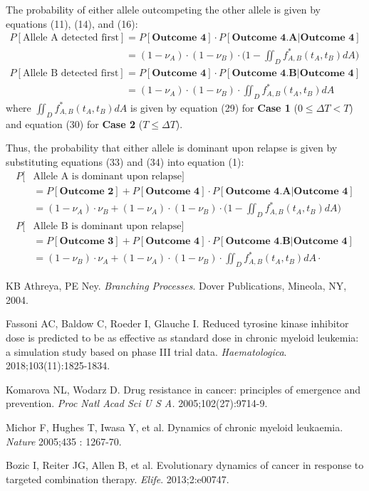 \documentclass{article}
\begin{document}
The probability of either allele outcompeting the other allele is given by equations (11), (14), and (16):
\begin{equation}
\begin{split}
P[\text{Allele A detected first}] &= P[\textbf{Outcome 4}] \cdot P[\textbf{Outcome 4.A}|\textbf{Outcome 4}] \\
&= (1-\nu_A)\cdot(1-\nu_B)\cdot \Big(1- \iint_D f^*_{A,B}(t_{A},t_{B}) dA\Big) \\
P[\text{Allele B detected first}] &= P[\textbf{Outcome 4}] 
\cdot P[\textbf{Outcome 4.B}|\textbf{Outcome 4}]  \\
&= (1-\nu_A)\cdot(1-\nu_B)\cdot \iint_D f^*_{A,B}(t_{A},t_{B}) dA
\end{split}
\end{equation}
where $\iint_D f^*_{A,B} (t_{A},t_{B}) dA$ is given by equation (29) for \textbf{Case 1} ($0 \leq \Delta T < T$) and equation (30) for \textbf{Case 2} ($T \leq \Delta T$).

Thus, the probability that either allele is dominant upon relapse is given by substituting equations (33) and (34) into equation (1):
\begin{equation}
\begin{split}
P[&\text{Allele A is dominant upon relapse}] \\ & = P[\textbf{Outcome 2}] + P[\textbf{Outcome 4}] \cdot P[\textbf{Outcome 4.A}|\textbf{Outcome 4}] \\
& = (1-\nu_A) \cdot \nu_B + (1-\nu_A)\cdot(1-\nu_B)\cdot \Big(1- \iint_D f^*_{A,B}(t_{A},t_{B}) dA\Big) \\
P[&\text{Allele B is dominant upon relapse}] \\ & = P[\textbf{Outcome 3}] + P[\textbf{Outcome 4}] \cdot P[\textbf{Outcome 4.B}|\textbf{Outcome 4}]  \\
& = (1-\nu_B) \cdot \nu_A + (1-\nu_A)\cdot(1-\nu_B)\cdot  \iint_D f^*_{A,B}(t_{A},t_{B}) dA \cdot
\end{split}
\end{equation}

\begin{thebibliography}{9}
KB Athreya, PE Ney.
\textit{Branching Processes}.
Dover Publications, Mineola, NY, 2004.

Fassoni AC, Baldow C, Roeder I, Glauche I. Reduced tyrosine kinase inhibitor dose is predicted to be as effective as standard dose in chronic myeloid leukemia: a simulation study based on phase III trial data. \textit{Haematologica}. 2018;103(11):1825-1834.

Komarova NL, Wodarz D. Drug resistance in cancer: principles of emergence and prevention. \textit{Proc Natl Acad Sci U S A.} 2005;102(27):9714-9.

Michor F, Hughes T, Iwasa Y, et al. Dynamics of chronic myeloid leukaemia. \textit{Nature} 2005;435 : 1267-70.

Bozic I, Reiter JG, Allen B, et al. Evolutionary dynamics of cancer in response to targeted combination therapy. \textit{Elife}. 2013;2:e00747.

\end{thebibliography}
\end{document}
